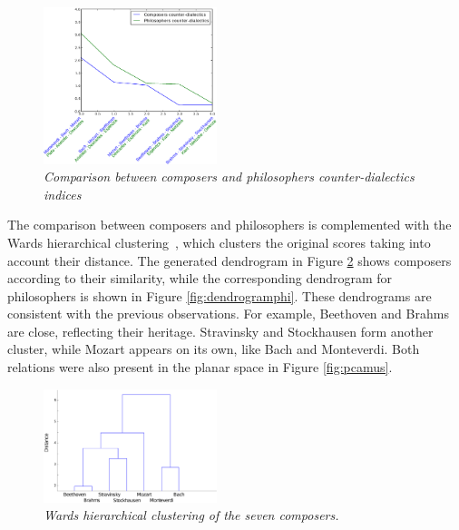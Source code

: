 \documentclass[
 aip,
 jmp,
 amsmath,amssymb,
 reprint,
]{revtex4-1}
\begin{document}
\begin{figure}[ht]
  \begin{center}
    \includegraphics[width=0.45\textwidth]{compara_dialeticas2}
  \end{center}
  \caption{\it Comparison between composers and philosophers
    counter-dialectics indices}
  \label{fig:comparingdialectics}
\end{figure}

The comparison between composers and philosophers is complemented with
the Wards hierarchical clustering~\cite{Ward}, which clusters the
original scores taking into account their distance. The generated
dendrogram in Figure \ref{fig:dendrogrammus} shows composers according
to their similarity, while the corresponding dendrogram for
philosophers is shown in Figure \ref{fig:dendrogramphi}. These
dendrograms are consistent with the previous observations. For
example, Beethoven and Brahms are close, reflecting their
heritage. Stravinsky and Stockhausen form another cluster, while
Mozart appears on its own, like Bach and Monteverdi. Both relations
were also present in the planar space in Figure \ref{fig:pcamus}.

\begin{figure}[ht]
        \begin{center}
          \includegraphics[width=0.45\textwidth]{Clust_Compositores.eps}
        \end{center}
        \caption{\it Wards hierarchical clustering of the seven composers.}
        \label{fig:dendrogrammus}
\end{figure}
\end{document}
